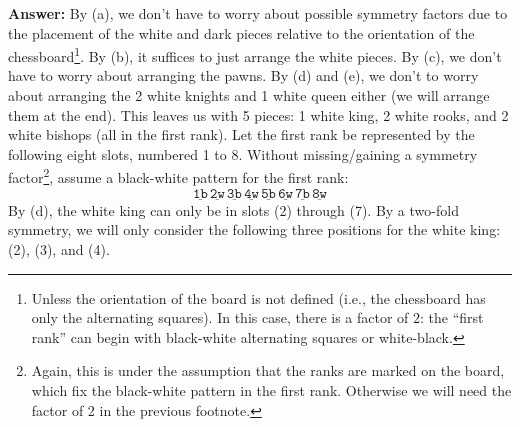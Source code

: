 \documentclass[11pt]{article}
\begin{document}
\noindent \textbf{Answer:} By (a), we don't have to worry about possible symmetry factors due to the placement of the white and dark pieces relative to the orientation of the chessboard\footnote{Unless the orientation of the board is not defined (i.e., the chessboard has only the alternating squares). In this case, there is a factor of $2$: the ``first rank'' can begin with black-white alternating squares or white-black.}. By (b), it suffices to just arrange the white pieces. By (c), we don't have to worry about arranging the pawns. By (d) and (e), we don't to worry about arranging the 2 white knights and 1 white queen either (we will arrange them at the end). This leaves us with 5 pieces: 1 white king, 2 white rooks, and 2 white bishops (all in the first rank). Let the first rank be represented by the following eight slots, numbered 1 to 8. Without missing/gaining a symmetry factor\footnote{Again, this is under the assumption that the ranks are marked on the board, which fix the black-white pattern in the first rank. Otherwise we will need the factor of 2 in the previous footnote.}, assume a black-white pattern for the first rank: 
\begin{equation*}
\underline{\texttt{1b}}\,
\underline{\texttt{2w}}\,
\underline{\texttt{3b}}\,
\underline{\texttt{4w}}\,
\underline{\texttt{5b}}\,
\underline{\texttt{6w}}\,
\underline{\texttt{7b}}\,
\underline{\texttt{8w}}
\end{equation*}
By (d), the white king can only be in slots (2) through (7). By a two-fold symmetry, we will only consider the following three positions for the white king: (2), (3), and (4). 
\end{document}
